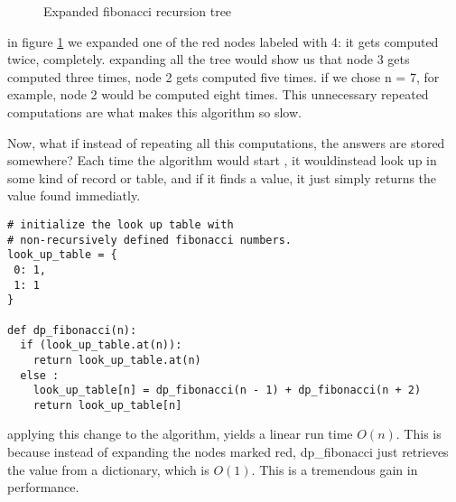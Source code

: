 \begin{figure}[ht]
  \centering
  \caption{Expanded fibonacci recursion tree}
  \label{fig:fib2}
\end{figure}

in figure \ref{fig:fib2} we expanded one of the red nodes labeled with 4: it gets computed twice, completely.
expanding all the tree would show us that node 3 gets computed three times, node 2 gets computed five times.
if we chose n = 7, for example, node 2 would be computed eight times. This unnecessary repeated
computations are  what makes this algorithm so slow.

Now, what if instead of repeating all this computations, the answers are stored somewhere? Each
time the algorithm would start , it wouldinstead look up in some kind of record or table, 
and if it finds a value, it just simply returns the value found immediatly.


\begin{verbatim}
# initialize the look up table with 
# non-recursively defined fibonacci numbers.
look_up_table = {
 0: 1,
 1: 1  
}

def dp_fibonacci(n):
  if (look_up_table.at(n)):
    return look_up_table.at(n)
  else :
    look_up_table[n] = dp_fibonacci(n - 1) + dp_fibonacci(n + 2)
    return look_up_table[n]
\end{verbatim}


applying this change to the algorithm, yields a linear run time $O(n)$. This is because instead of expanding the
nodes marked red, dp\_fibonacci just retrieves the value from a dictionary, which is $O(1)$. This
is a tremendous gain in performance.



